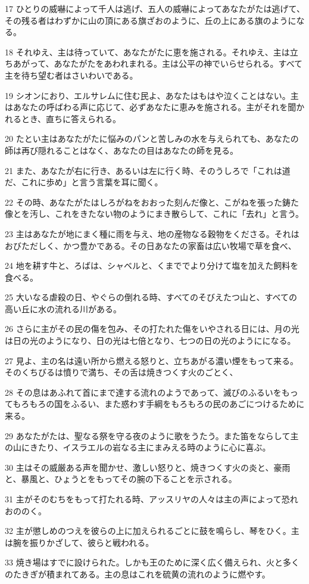 \par 17 ひとりの威嚇によって千人は逃げ、五人の威嚇によってあなたがたは逃げて、その残る者はわずかに山の頂にある旗ざおのように、丘の上にある旗のようになる。
\par 18 それゆえ、主は待っていて、あなたがたに恵を施される。それゆえ、主は立ちあがって、あなたがたをあわれまれる。主は公平の神でいらせられる。すべて主を待ち望む者はさいわいである。
\par 19 シオンにおり、エルサレムに住む民よ、あなたはもはや泣くことはない。主はあなたの呼ばわる声に応じて、必ずあなたに恵みを施される。主がそれを聞かれるとき、直ちに答えられる。
\par 20 たとい主はあなたがたに悩みのパンと苦しみの水を与えられても、あなたの師は再び隠れることはなく、あなたの目はあなたの師を見る。
\par 21 また、あなたが右に行き、あるいは左に行く時、そのうしろで「これは道だ、これに歩め」と言う言葉を耳に聞く。
\par 22 その時、あなたがたはしろがねをおおった刻んだ像と、こがねを張った鋳た像とを汚し、これをきたない物のようにまき散らして、これに「去れ」と言う。
\par 23 主はあなたが地にまく種に雨を与え、地の産物なる穀物をくださる。それはおびただしく、かつ豊かである。その日あなたの家畜は広い牧場で草を食べ、
\par 24 地を耕す牛と、ろばは、シャベルと、くまででより分けて塩を加えた飼料を食べる。
\par 25 大いなる虐殺の日、やぐらの倒れる時、すべてのそびえたつ山と、すべての高い丘に水の流れる川がある。
\par 26 さらに主がその民の傷を包み、その打たれた傷をいやされる日には、月の光は日の光のようになり、日の光は七倍となり、七つの日の光のようにになる。
\par 27 見よ、主の名は遠い所から燃える怒りと、立ちあがる濃い煙をもって来る。そのくちびるは憤りで満ち、その舌は焼きつくす火のごとく、
\par 28 その息はあふれて首にまで達する流れのようであって、滅びのふるいをもってもろもろの国をふるい、また惑わす手綱をもろもろの民のあごにつけるために来る。
\par 29 あなたがたは、聖なる祭を守る夜のように歌をうたう。また笛をならして主の山にきたり、イスラエルの岩なる主にまみえる時のように心に喜ぶ。
\par 30 主はその威厳ある声を聞かせ、激しい怒りと、焼きつくす火の炎と、豪雨と、暴風と、ひょうとをもってその腕の下ることを示される。
\par 31 主がそのむちをもって打たれる時、アッスリヤの人々は主の声によって恐れおののく。
\par 32 主が懲しめのつえを彼らの上に加えられるごとに鼓を鳴らし、琴をひく。主は腕を振りかざして、彼らと戦われる。
\par 33 焼き場はすでに設けられた。しかも王のために深く広く備えられ、火と多くのたきぎが積まれてある。主の息はこれを硫黄の流れのように燃やす。

